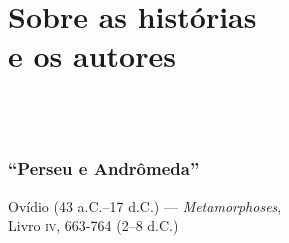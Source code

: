 
\part[Sobre as histórias e os autores]{Sobre as histórias\\ e os autores}

\chapter*{\ }

\section{“Perseu e Andrômeda”}

{\centering
Ovídio (43 a.C.--17 d.C.) --- \textit{Metamorphoses},\\ Livro \textsc{iv}, 663-764 (2--8 d.C.)
\par\smallskip}

